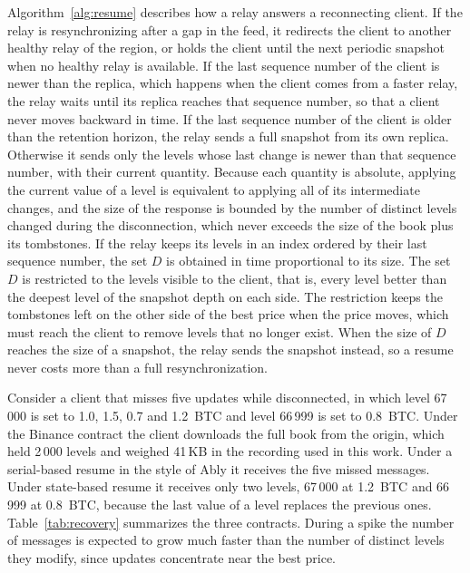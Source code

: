 \documentclass[conference]{IEEEtran}
\begin{document}
Algorithm~\ref{alg:resume} describes how a relay answers a reconnecting client. If the relay is resynchronizing after a gap in the feed, it redirects the client to another healthy relay of the region, or holds the client until the next periodic snapshot when no healthy relay is available. If the last sequence number of the client is newer than the replica, which happens when the client comes from a faster relay, the relay waits until its replica reaches that sequence number, so that a client never moves backward in time. If the last sequence number of the client is older than the retention horizon, the relay sends a full snapshot from its own replica. Otherwise it sends only the levels whose last change is newer than that sequence number, with their current quantity. Because each quantity is absolute, applying the current value of a level is equivalent to applying all of its intermediate changes, and the size of the response is bounded by the number of distinct levels changed during the disconnection, which never exceeds the size of the book plus its tombstones. If the relay keeps its levels in an index ordered by their last sequence number, the set $D$ is obtained in time proportional to its size. The set $D$ is restricted to the levels visible to the client, that is, every level better than the deepest level of the snapshot depth on each side. The restriction keeps the tombstones left on the other side of the best price when the price moves, which must reach the client to remove levels that no longer exist. When the size of $D$ reaches the size of a snapshot, the relay sends the snapshot instead, so a resume never costs more than a full resynchronization.

Consider a client that misses five updates while disconnected, in which level 67\,000 is set to 1.0, 1.5, 0.7 and 1.2~BTC and level 66\,999 is set to 0.8~BTC. Under the Binance contract the client downloads the full book from the origin, which held 2\,000 levels and weighed 41\,KB in the recording used in this work. Under a serial-based resume in the style of Ably \cite{ably-states} it receives the five missed messages. Under state-based resume it receives only two levels, 67\,000 at 1.2~BTC and 66\,999 at 0.8~BTC, because the last value of a level replaces the previous ones. Table~\ref{tab:recovery} summarizes the three contracts. During a spike the number of messages is expected to grow much faster than the number of distinct levels they modify, since updates concentrate near the best price.
\end{document}
